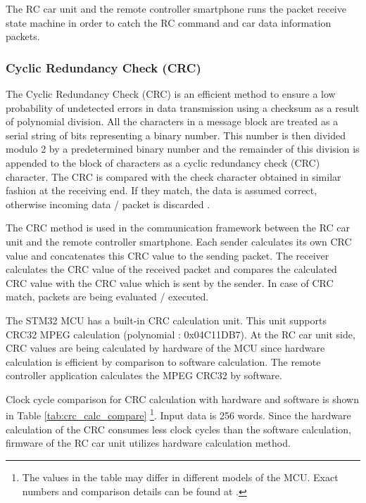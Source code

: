 The RC car unit and the remote controller smartphone runs the packet receive state machine in order to catch the RC command and car data information packets.

\subsubsection{Cyclic Redundancy Check (CRC)}

The  Cyclic  Redundancy  Check  (CRC)  is  an  efficient  method  to  ensure  a  low  probability of undetected errors in data transmission using a checksum as a result of polynomial  division. All the characters in a message block are treated as a serial string of bits representing a binary number. This number is then divided modulo 2 by a predetermined binary number and the remainder of this division is appended to the block of characters as a cyclic redundancy check (CRC) character. The CRC is compared with the check character obtained in similar fashion at the receiving end. If they match, the data is assumed correct, otherwise incoming data / packet is discarded \cite{crc_book} \cite{crc_article}. 

The CRC method is used in the communication framework between the RC car unit and the remote controller smartphone. Each sender calculates its own CRC value and concatenates this CRC value to the sending packet. The receiver calculates the CRC value of the received packet and compares the calculated CRC value with the CRC value which is sent by the sender. In case of CRC match, packets are being evaluated / executed. 

The STM32 MCU has a built-in CRC calculation unit. This unit supports CRC32 MPEG calculation (polynomial : 0x04C11DB7). At the RC car unit side, CRC values are being calculated by hardware of the MCU since hardware calculation is efficient by comparison to software calculation. The remote controller application calculates the MPEG CRC32 by software. 

Clock cycle comparison for CRC calculation with hardware and software is shown in Table \ref{tab:crc_calc_compare} \footnote{The values in the table may differ in different models of the MCU. Exact numbers and comparison details can be found at \cite{Ref_stm32_um}.}. Input data is 256 words. Since the hardware calculation of the CRC consumes less clock cycles than the software calculation, firmware of the RC car unit utilizes hardware calculation method. \\

